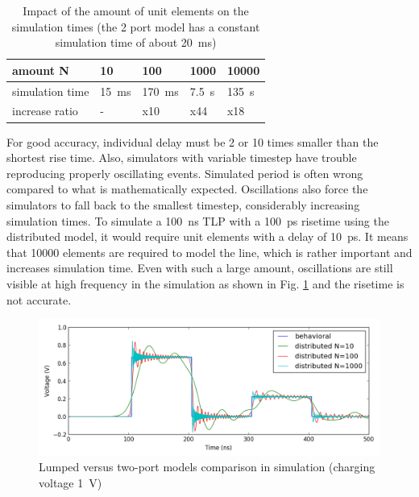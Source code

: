\begin{table}[!h]
\centering
\begin{tabular}{@{}lllll@{}}
\toprule
amount N         &  10                      & 100                     &  1000               &   10000                \\ \midrule
simulation time  &  \SI{15}{\milli\second}  & \SI{170}{\milli\second} &  \SI{7.5}{\second}  &   \SI{135}{\second}    \\
increase ratio   &  -                       & x10                     &  x44                &   x18                  \\
\bottomrule
\end{tabular}
\caption{Impact of the amount of unit elements on the simulation times (the 2 port model has a constant simulation time of about \SI{20}{\milli\second})}
\label{tab:tline-impact-simulation-time}
\end{table}

For good accuracy, individual delay must be 2 or 10 times smaller than the shortest rise time.
Also, simulators with variable timestep have trouble reproducing properly oscillating events.
Simulated period is often wrong compared to what is mathematically expected.
Oscillations also force the simulators to fall back to the smallest timestep, considerably increasing simulation times.
To simulate a \SI{100}{\nano\second} TLP with a \SI{100}{\pico\second} risetime using the distributed model, it would require unit elements with a delay of \SI{10}{\pico\second}.
It means that 10000 elements are required to model the line, which is rather important and increases simulation time.
Even with such a large amount, oscillations are still visible at high frequency in the simulation as shown in Fig. \ref{fig:lines-simulations} and the risetime is not accurate.

\begin{figure}[!h]
  \centering
  \includegraphics[width=\textwidth]{src/2/figures/tline_comparison.png}
  \caption{Lumped versus two-port models comparison in simulation (charging voltage \SI{1}{\volt})}
  \label{fig:lines-simulations}
\end{figure}

